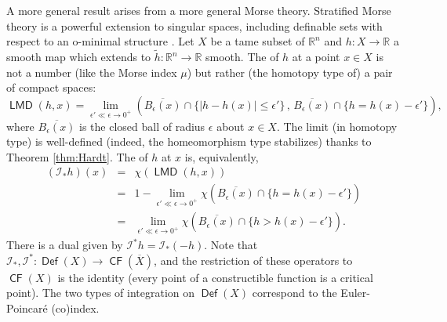 \documentclass{psapm-l}
\theoremstyle{definition}
\theoremstyle{remark}
\numberwithin{equation}{section}
\begin{document}
A more general result arises from a more general Morse theory.  Stratified Morse theory \cite{GM} is a powerful extension to singular  spaces, including definable sets with respect to an o-minimal structure \cite{BK,Schurmann}. Let $X$ be a tame subset of ${{\mathbb R}}^n$ and $h\colon X\to{{\mathbb R}}$ a smooth map which extends to $\widetilde{h}\colon{{\mathbb R}}^n\to{{\mathbb R}}$ smooth. The {{}} of $h$ at a point $x\in X$ is not a number (like the Morse index $\mu$) but rather (the homotopy type of) a pair of compact spaces:
\[
    {{{\operatorname{\mathsf{{LMD}}}}}}(h,x) =
    \lim_{\epsilon'\ll\epsilon\to 0^+}
    \left(
        \overline{B_\epsilon(x)}
        \cap
        \{{\left\vert{{h-h(x)}}\right\vert}\leq\epsilon'\}
    \, , \,
        \overline{B_\epsilon(x)}
        \cap
        \{h=h(x)-\epsilon'\}
    \right) ,
\]
where $\overline{B_\epsilon(x)}$ is the closed ball of radius $\epsilon$ about $x\in X$. The limit (in homotopy type) is well-defined (indeed, the homeomorphism type stabilizes) thanks to Theorem \ref{thm:Hardt}. The {{}} of $h$ at $x$ is, equivalently,
\begin{eqnarray*}
\label{eq:index}
    ({{\mathcal I}}_*h)(x) &=& \chi({{{\operatorname{\mathsf{{LMD}}}}}}(h,x)) \\
        &=&
        1-
        \lim_{\epsilon'\ll\epsilon\to 0^+} \chi\left(\overline{B_\epsilon(x)}\cap\{h=h(x)-\epsilon'\}\right) \\
        &=&
        \lim_{\epsilon'\ll\epsilon\to 0^+}
        \chi\left(
        \overline{B_\epsilon(x)}
        \cap
        \{h>h(x)-\epsilon'\}
        \right) .
\end{eqnarray*}
There is a dual {{}} given by ${{\mathcal I}}^*h={{\mathcal I}}_*(-h)$. Note that ${{\mathcal I}}_*,{{\mathcal I}}^*\colon{{{\operatorname{\mathsf{{Def}}}}}}(X)\to {{{\operatorname{\mathsf{{CF}}}}}}(\overline{X})$, and the restriction of these operators to ${{{\operatorname{\mathsf{{CF}}}}}}(X)$ is the identity (every point of a constructible function is a critical point). The two types of integration on ${{{\operatorname{\mathsf{{Def}}}}}}(X)$ correspond to the Euler-Poincar\'e (co)index.
\end{document}
